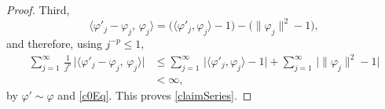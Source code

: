 \documentclass[twoside,11pt,letter]{article}
\theoremstyle{definition}
\theoremstyle{definition}
\theoremstyle{plain}
\begin{document}
\begin{proof}
Third,
\begin{equation*}
\langle\varphi'_j-\varphi_j,\,\varphi_j\rangle
=\big(\langle\varphi'_j,\varphi_j\rangle-1\big)-\big(\|\varphi_j\|^2-1\big),
\end{equation*}
and therefore, using $j^{-p}\leq1$,
\begin{equation*}
\begin{split}
\sum_{j=1}^\infty\,\frac{1}{j^p}\,\big|\langle\varphi'_j-\varphi_j,\,\varphi_j\rangle\big|
&\leq\sum_{j=1}^\infty\,\big|\langle\varphi'_j,\varphi_j\rangle-1\big|
+\sum_{j=1}^\infty\,\big|\|\varphi_j\|^2-1\big|\\
&<\infty,
\end{split}
\end{equation*}
by $\varphi'\sim\varphi$ and \eqref{c0Eq}. This proves \eqref{claimSeries}.
\end{proof}
\end{document}
